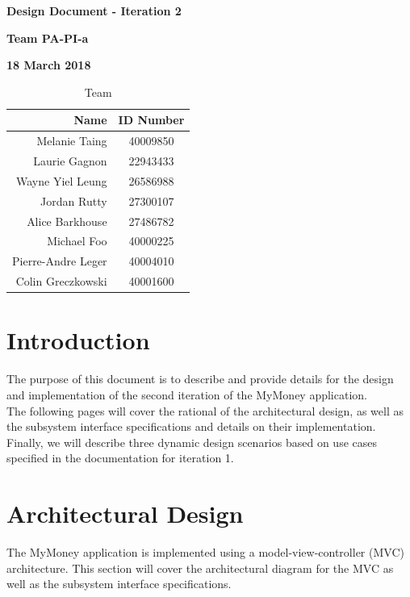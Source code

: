 \documentclass[12pt]{article}
\begin{document}
\newcommand{\code}[1]{\colorbox{light-gray}{\texttt{#1}}}

\vspace*{0.5in}
\centerline{\bf\Large Design Document - Iteration 2}

\vspace*{0.5in}
\centerline{\bf\Large Team PA-PI-a}

\vspace*{0.5in}
\centerline{\bf\Large 18 March 2018}

\vspace*{1.5in}
\begin{table}[htbp]
\caption{Team}
\begin{center}
\begin{tabular}{|r | c|}
\hline
Name & ID Number \\
\hline\hline
Melanie Taing & 40009850 \\
Laurie Gagnon & 22943433 \\
Wayne Yiel Leung & 26586988 \\
Jordan Rutty & 27300107 \\
Alice Barkhouse & 27486782 \\
Michael Foo & 40000225 \\
Pierre-Andre Leger & 40004010 \\
Colin Greczkowski & 40001600 \\
\hline
\end{tabular}
\end{center}
\end{table}

\clearpage

\tableofcontents
\clearpage

\listoffigures
\clearpage

\section{Introduction}
The purpose of this document is to describe and provide details for the design and
implementation of the second iteration of the MyMoney application.\\

The following pages will cover the rational of the architectural design, as well as the
subsystem interface specifications and details on their implementation. Finally, we will
describe three dynamic design scenarios based on use cases specified in the documentation
for iteration 1.

\section{Architectural Design} \label{sec:arch}
The MyMoney application is implemented using a model-view-controller (MVC) architecture. This section will cover the architectural diagram for the MVC as well as the subsystem interface specifications.
\newpage
\end{document}
